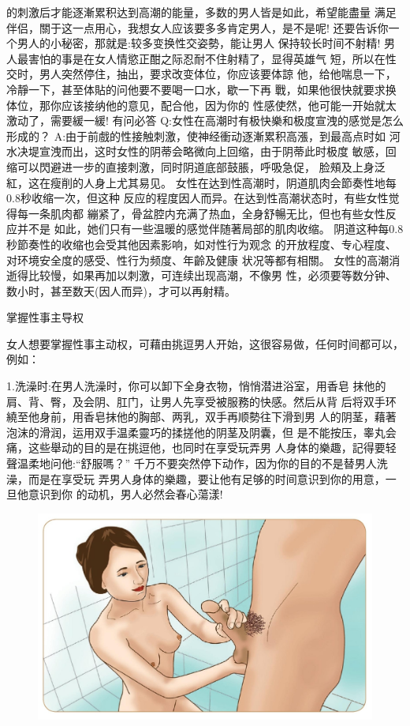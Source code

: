 \documentclass[12pt,UTF8]{ctexbook}
\begin{document}
的刺激后才能逐漸累积达到高潮的能量，多数的男人皆是如此，希望能盡量
满足伴侣，關于这一点用心，我想女人应该要多多肯定男人，是不是呢!
还要告诉你一个男人的小秘密，那就是:较多变换性交姿勢，能让男人
保持较长时间不射精!
男人最害怕的事是在女人情慾正酣之际忍耐不住射精了，显得英雄气
短，所以在性交时，男人突然停住，抽出，要求改变体位，你应该要体諒
他，给他喘息一下，冷靜一下，甚至体貼的问他要不要喝一口水，歇一下再
戰，如果他很快就要求换体位，那你应该接纳他的意见，配合他，因为你的
性感使然，他可能一开始就太激动了，需要緩一緩!
有问必答
Q:女性在高潮时有极快樂和极度宣洩的感觉是怎么形成的？
A:由于前戲的性接触刺激，使神经衝动逐漸累积高漲，到最高点时如
河水决堤宣洩而出，这时女性的阴蒂会略微向上回缩，由于阴蒂此时极度
敏感，回缩可以閃避进一步的直接刺激，同时阴道底部鼓脹，呼吸急促，
脸頰及上身泛紅，这在瘦削的人身上尤其易见。
女性在达到性高潮时，阴道肌肉会節奏性地每0.8秒收缩一次，但这种
反应的程度因人而异。在达到性高潮状态时，有些女性觉得每一条肌肉都
繃紧了，骨盆腔内充满了热血，全身舒暢无比，但也有些女性反应并不是
如此，她们只有一些温暖的感觉伴随著局部的肌肉收缩。
阴道这种每0.8秒節奏性的收缩也会受其他因素影响，如对性行为观念
的开放程度、专心程度、对环境安全度的感受、性行为频度、年齡及健康
状况等都有相關。
女性的高潮消逝得比较慢，如果再加以刺激，可连续出现高潮，不像男
性，必须要等数分钟、数小时，甚至数天(因人而异)，才可以再射精。

掌握性事主导权

女人想要掌握性事主动权，可藉由挑逗男人开始，这很容易做，任何时间都可以，例如：

1.洗澡时:在男人洗澡时，你可以卸下全身衣物，悄悄潜进浴室，用香皂
抹他的肩、背、臀，及会阴、肛门，让男人先享受被服務的快感。然后从背
后将双手环繞至他身前，用香皂抹他的胸部、两乳，双手再顺勢往下滑到男
人的阴茎，藉著泡沫的滑润，运用双手温柔靈巧的揉搓他的阴茎及阴囊，但
是不能按压，睾丸会痛，这些舉动的目的是在挑逗他，也同时在享受玩弄男
人身体的樂趣，記得要轻聲温柔地问他:“舒服嗎？”
千万不要突然停下动作，因为你的目的不是替男人洗澡，而是在享受玩
弄男人身体的樂趣，要让他有足够的时间意识到你的用意，一旦他意识到你
的动机，男人必然会春心蕩漾!

\begin{figure}[htbp]
	\centering
	\includegraphics[width=0.7\linewidth]{14}
	\caption{}
	\label{fig:1}
\end{figure}
\end{document}
